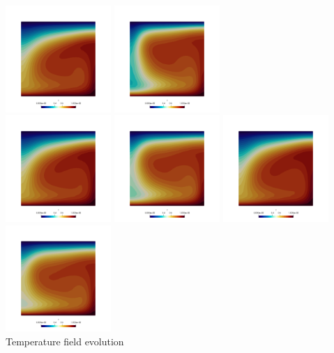\begin{center}
\includegraphics[width=4cm]{python_codes/fieldstone_28/results_case5/T_0100}
\includegraphics[width=4cm]{python_codes/fieldstone_28/results_case5/T_0110}\\
\includegraphics[width=4cm]{python_codes/fieldstone_28/results_case5/T_0120}
\includegraphics[width=4cm]{python_codes/fieldstone_28/results_case5/T_0130}
\includegraphics[width=4cm]{python_codes/fieldstone_28/results_case5/T_0140}
\includegraphics[width=4cm]{python_codes/fieldstone_28/results_case5/T_0150}\\
{\captionfont Temperature field evolution}
\end{center}

